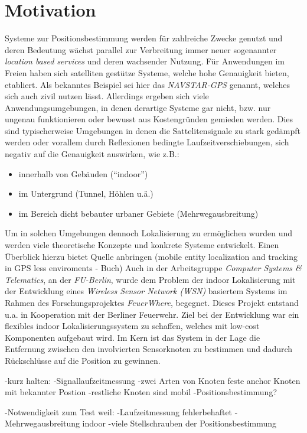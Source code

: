 \section{Motivation}
\label{sec:motivation}

Systeme zur Positionsbestimmung werden für zahlreiche Zwecke genutzt und deren Bedeutung wächst parallel zur
Verbreitung immer neuer sogenannter \textit{location based services} und deren wachsender Nutzung.
Für Anwendungen im Freien haben sich satelliten gestütze Systeme, welche hohe Genauigkeit bieten, etabliert.
Als bekanntes Beispiel sei hier das \textit{NAVSTAR-GPS} genannt, welches sich auch zivil nutzen lässt.
Allerdings ergeben sich viele Anwendungsumgebungen, in denen derartige Systeme gar nicht, bzw.
nur ungenau funktionieren oder bewusst aus Kostengründen gemieden werden. 
Dies sind typischerweise Umgebungen in denen die Sattelitensignale zu stark gedämpft werden oder
vorallem durch Reflexionen bedingte Laufzeitverschiebungen, sich negativ auf die Genauigkeit auswirken, wie z.B.: 


\begin{itemize}
  \item innerhalb von Gebäuden (``indoor'')
  \item im Untergrund (Tunnel, Höhlen u.ä.)
  \item im Bereich dicht bebauter urbaner Gebiete (Mehrwegausbreitung)
\end{itemize}

Um in solchen Umgebungen dennoch Lokalisierung zu ermöglichen wurden und werden viele theoretische Konzepte und 
konkrete Systeme entwickelt. Einen Überblick hierzu bietet
Quelle anbringen (mobile entity localization and tracking in GPS less enviroments - Buch)
Auch in der Arbeitsgruppe \textit{Computer Systems & Telematics}, an der \textit{FU-Berlin}, 
wurde dem Problem der indoor Lokalisierung mit der Entwicklung eines \textit{Wireless Sensor Network (WSN)}
basiertem Systems im Rahmen des Forschungsprojektes \textit{FeuerWhere}, begegnet. 
Dieses Projekt entstand u.a. in Kooperation mit der Berliner Feuerwehr.
Ziel bei der Entwicklung war ein flexibles indoor Lokalisierungssystem zu schaffen, welches mit
low-cost Komponenten aufgebaut wird. 
Im Kern ist das System in der Lage die Entfernung zwischen den involvierten Sensorknoten zu bestimmen und 
dadurch Rückschlüsse auf die Position zu gewinnen.

-kurz halten:
-Signallaufzeitmessung
-zwei Arten von Knoten feste anchor Knoten mit bekannter Postion 
-restliche Knoten sind mobil
-Positionsbestimmung?

-Notwendigkeit zum Test weil:
  -Laufzeitmessung fehlerbehaftet
  -Mehrwegausbreitung indoor
  -viele Stellschrauben der Positionsbestimmung

